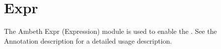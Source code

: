 \section{Expr}
\label{module:Expr}
\ClearAPI
The Ambeth Expr (Expression) module is used to enable the .  See the Annotation description for a detailed usage description.
